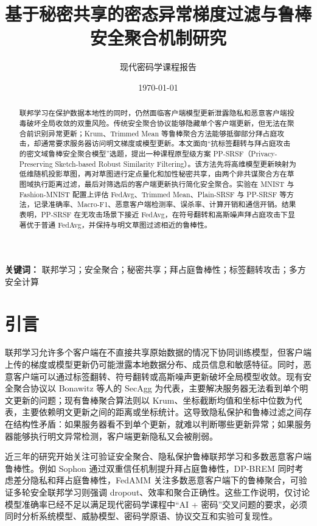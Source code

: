 \documentclass[UTF8,a4paper,zihao=-4]{ctexart}
\title{基于秘密共享的密态异常梯度过滤与鲁棒安全聚合机制研究}
\author{现代密码学课程报告}
\date{\today}
\begin{document}
\maketitle

\begin{abstract}
联邦学习在保护数据本地性的同时，仍然面临客户端模型更新泄露隐私和恶意客户端投毒破坏全局收敛的双重风险。传统安全聚合协议能够隐藏单个客户端更新，但无法在聚合前识别异常更新；Krum、Trimmed Mean 等鲁棒聚合方法能够抵御部分拜占庭攻击，却通常要求服务器访问明文梯度或模型更新。本文面向“抗标签翻转与拜占庭攻击的密文域鲁棒安全聚合模型”选题，提出一种课程原型级方案 PP-SRSF（Privacy-Preserving Sketch-based Robust Similarity Filtering）。该方法先将高维模型更新映射为低维随机投影草图，再对草图进行定点量化和加性秘密共享，由两个非共谋聚合方在草图域执行距离过滤，最后对筛选后的客户端更新执行简化安全聚合。实验在 MNIST 与 Fashion-MNIST 配置上评估 FedAvg、Trimmed Mean、Plain-SRSF 与 PP-SRSF 等方法，记录准确率、Macro-F1、恶意客户端检测率、误杀率、计算开销和通信开销。结果表明，PP-SRSF 在无攻击场景下接近 FedAvg，在符号翻转和高斯噪声拜占庭攻击下显著优于普通 FedAvg，并保持与明文草图过滤相近的鲁棒性。
\end{abstract}

\textbf{关键词：} 联邦学习；安全聚合；秘密共享；拜占庭鲁棒性；标签翻转攻击；多方安全计算

\section{引言}
联邦学习允许多个客户端在不直接共享原始数据的情况下协同训练模型，但客户端上传的梯度或模型更新仍可能泄露本地数据分布、成员信息和敏感特征。同时，恶意客户端可以通过标签翻转、符号翻转或高斯噪声更新破坏全局模型收敛。现有安全聚合协议以 Bonawitz 等人的 SecAgg 为代表，主要解决服务器无法看到单个明文更新的问题\cite{bonawitz2017secagg}；现有鲁棒聚合算法则以 Krum、坐标截断均值和坐标中位数为代表，主要依赖明文更新之间的距离或坐标统计\cite{blanchard2017krum}。这导致隐私保护和鲁棒过滤之间存在结构性矛盾：如果服务器看不到单个更新，就难以判断哪些更新异常；如果服务器能够执行明文异常检测，客户端更新隐私又会被削弱。

近三年的研究开始关注可验证安全聚合、隐私保护鲁棒联邦学习和多数恶意客户端鲁棒性。例如 Sophon 通过双重信任机制提升拜占庭鲁棒性\cite{sophon2025}，DP-BREM 同时考虑差分隐私和拜占庭鲁棒性\cite{gu2025dpbrem}，FedAMM 关注多数恶意客户端下的鲁棒聚合\cite{fedamm2025}，可验证多轮安全联邦学习则强调 dropout、效率和聚合正确性\cite{li2026verifiable}。这些工作说明，仅讨论模型准确率已经不足以满足现代密码学课程中“AI + 密码”交叉问题的要求，必须同时分析系统模型、威胁模型、密码学原语、协议交互和实验可复现性。
\end{document}

